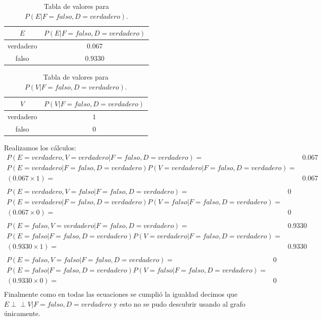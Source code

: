 \documentclass[12pt]{article}
\begin{document}
\begin{table}[h!]
	\centering
	\begin{tabular}{|c|c|}
		\hline
		\rowcolor[gray]{.8}
		$E$&$P(E|F=falso,D=verdadero)$ \\\hline %
		verdadero & $0.067$\\\hline
		falso & $0.9330$\\\hline
	\end{tabular}
	\caption{Tabla de valores para $P(E|F=falso,D=verdadero)$.}
	\label{tab:ej3e002}
\end{table}
\begin{table}[h!]
	\centering
	\begin{tabular}{|c|c|}
		\hline
		\rowcolor[gray]{.8}
		$V$&$P(V|F=falso,D=verdadero)$ \\\hline %
		verdadero & $1$\\\hline
		falso & $0$\\\hline
	\end{tabular}
	\caption{Tabla de valores para $P(V|F=falso,D=verdadero)$.}
	\label{tab:ej3e003}
\end{table}
Realizamos los cálculos:
\begin{equation}
\begin{split}
P(E=verdadero,V=verdadero|F=falso,D=verdadero)=&0.067\\
P(E=verdadero|F=falso,D=verdadero)P(V=verdadero|F=falso,D=verdadero)=&\\
(0.067\times 1) =& 0.067\\
\end{split}
\end{equation}
\begin{equation}
\begin{split}
P(E=verdadero,V=falso|F=falso,D=verdadero)=&0\\
P(E=verdadero|F=falso,D=verdadero)P(V=falso|F=falso,D=verdadero)=&\\
(0.067\times 0) =& 0\\
\end{split}
\end{equation}
\begin{equation}
\begin{split}
P(E=falso,V=verdadero|F=falso,D=verdadero)=&0.9330\\
P(E=falso|F=falso,D=verdadero)P(V=verdadero|F=falso,D=verdadero)=&\\
(0.9330\times 1) =& 0.9330\\
\end{split}
\end{equation}
\begin{equation}
\begin{split}
P(E=falso,V=falso|F=falso,D=verdadero)=&0\\
P(E=falso|F=falso,D=verdadero)P(V=falso|F=falso,D=verdadero)=&\\
(0.9330\times 0) =& 0\\
\end{split}
\end{equation}
Finalmente como en todas las ecuaciones se cumplió la igualdad decimos que $E  \perp\!\!\!\perp V | F=falso,D=verdadero$ y esto no se pudo descubrir usando al grafo únicamente.
\end{document}
